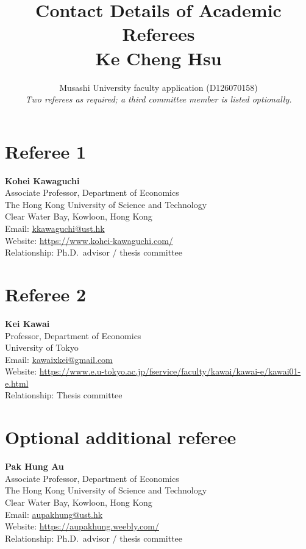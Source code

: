 \documentclass[11pt]{article}
\title{Contact Details of Academic Referees\\{\large Ke Cheng Hsu}}
\author{Musashi University faculty application (D126070158)\\
\textit{Two referees as required; a third committee member is listed optionally.}}
\date{}
\begin{document}
\maketitle
\vspace{-1em}

\section*{Referee 1}
\textbf{Kohei Kawaguchi}\\
Associate Professor, Department of Economics\\
The Hong Kong University of Science and Technology\\
Clear Water Bay, Kowloon, Hong Kong\\
Email: \href{mailto:kkawaguchi@ust.hk}{kkawaguchi@ust.hk}\\
Website: \url{https://www.kohei-kawaguchi.com/}\\
Relationship: Ph.D.\ advisor / thesis committee

\section*{Referee 2}
\textbf{Kei Kawai}\\
Professor, Department of Economics\\
University of Tokyo\\
Email: \href{mailto:kawaixkei@gmail.com}{kawaixkei@gmail.com}\\
Website: \url{https://www.e.u-tokyo.ac.jp/fservice/faculty/kawai/kawai-e/kawai01-e.html}\\
Relationship: Thesis committee

\section*{Optional additional referee}
\textbf{Pak Hung Au}\\
Associate Professor, Department of Economics\\
The Hong Kong University of Science and Technology\\
Clear Water Bay, Kowloon, Hong Kong\\
Email: \href{mailto:aupakhung@ust.hk}{aupakhung@ust.hk}\\
Website: \url{https://aupakhung.weebly.com/}\\
Relationship: Ph.D.\ advisor / thesis committee
\end{document}

